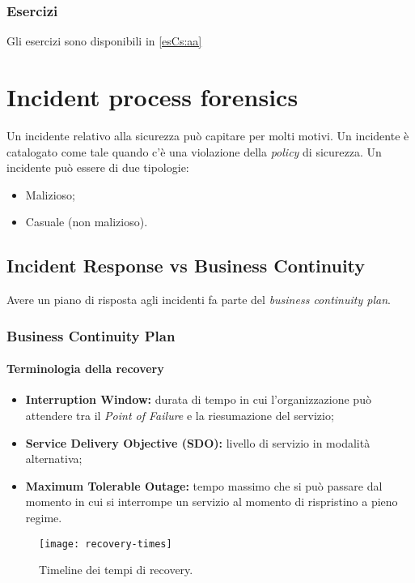\section{Esercizi}

Gli esercizi sono disponibili in \ref{esCs:aa}

\part{Incident process forensics}

Un incidente relativo alla sicurezza può capitare per molti motivi. Un
incidente è catalogato come tale quando c'è una violazione della
\textit{policy} di sicurezza. Un incidente può essere di due tipologie:
\begin{itemize}
\item Malizioso;
\item Casuale (non malizioso).
\end{itemize}

\chapter{Incident Response vs Business Continuity}
\label{IRBC}

Avere un piano di risposta agli incidenti fa parte del \textit{business
continuity plan}.

\section{Business Continuity Plan}

\subsection{Terminologia della recovery}

\begin{itemize}
\item \textbf{Interruption Window:} durata di tempo in cui l'organizzazione
può attendere tra il \textit{Point of Failure} e la riesumazione del servizio;
\item \textbf{Service Delivery Objective (SDO):} livello di servizio in
modalità alternativa;
\item \textbf{Maximum Tolerable Outage:} tempo massimo che si può passare dal
momento in cui si interrompe un servizio al momento di rispristino a pieno
regime.
\end{itemize}

\begin{figure}
        \begin{center}
                \texttt{[image: recovery-times]}
        \end{center}
        \caption{Timeline dei tempi di recovery.}
        \label{fig:recovery:timeline}
\end{figure}

